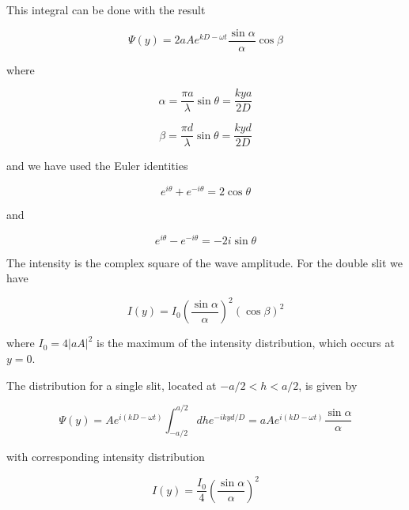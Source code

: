 \documentclass[11pt]{article}
\begin{document}
This integral can be done with the result

\begin{equation}
  \Psi(y) = 2aA e^{kD-\omega t}\frac{\sin\alpha}{\alpha}\cos\beta
\end{equation}

\noindent where

\begin{equation}
  \alpha = \frac{\pi a}{\lambda}\sin\theta = \frac{kya}{2D}
\end{equation}

\begin{equation}
  \beta = \frac{\pi d}{\lambda}\sin\theta = \frac{kyd}{2D}
\end{equation}

\noindent and we have used the Euler identities

\begin{equation}
  e^{i\theta} + e^{-i\theta} = 2\cos\theta
\end{equation}

\noindent and

\begin{equation}
  e^{i\theta} - e^{-i\theta} = -2i\sin\theta
\end{equation}

\noindent The intensity is the complex square of the wave amplitude. For the
double slit we have

\begin{equation}
  I(y) = I_0\left( \frac{\sin\alpha}{\alpha} \right)^2\left( \cos\beta \right)^2
  \label{eq: I(y)}
\end{equation}

\noindent where $I_0 = 4|aA|^2$ is the maximum of the intensity distribution,
which occurs at $y=0$.

The distribution for a single slit, located at $-a/2<h<a/2$, is given by

\begin{equation}
  \Psi(y) = Ae^{i(kD - \omega t)}\int_{-a/2}^{a/2}dh e^{-ikyd/D} =
  aA e^{i(kD - \omega t)}\frac{\sin\alpha}{\alpha}
\end{equation}

with corresponding intensity distribution

\begin{equation}
  I(y) = \frac{I_0}{4}\left( \frac{\sin\alpha}{\alpha} \right)^2
\end{equation}
\end{document}
